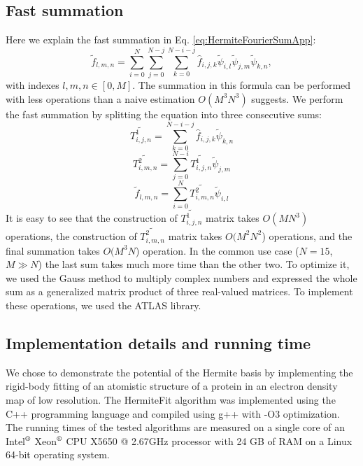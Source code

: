 \subsection{Fast summation}
\label{Sec: Fast summation}
%
Here we explain the fast summation in Eq. \ref{eq:HermiteFourierSumApp}: 
%
\begin{equation}
\tilde{f}_{l,m,n}=\sum_{i=0}^{N}\sum_{j=0}^{N-j}\sum_{k=0}^{N-i-j}\hat{f}_{i,j,k}\tilde{\psi}_{i,l}\tilde{\psi}_{j,m}\tilde{\psi}_{k,n}\label{eq:HermiteFourierSumApp}
,
\end{equation}
with indexes $l,m,n\in[0,M]$. The summation in this formula can
be performed with less operations than a naive estimation $O(M^{3}N^{3})$
suggests. We perform the fast summation by splitting the equation into
three consecutive sums:
%
\begin{equation}
\widetilde{T_{i,j,n}^{1}}=\sum_{k=0}^{N-i-j}\hat{f}_{i,j,k}\tilde{\psi}_{k,n}
\end{equation}
%
\begin{equation}
\widetilde{T_{i,m,n}^{2}}=\sum_{j=0}^{N-i}\widetilde{T_{i,j,n}^{1}}\tilde{\psi}_{j,m}
\end{equation}
%
\begin{equation}
\tilde{f}_{l,m,n}=\sum_{i=0}^{N}\widetilde{T_{i,m,n}^{2}}\tilde{\psi}_{i,l}
\end{equation}
%
It is easy to see that the construction of $\widetilde{T_{i,j,n}^{1}}$
matrix takes $O(MN^{3})$ operations, the construction of $\widetilde{T_{i,m,n}^{2}}$
matrix takes $O(M^{2}N^{2}$) operations, and the final summation
takes $O(M^{3}N$) operation. 
In the common use case ($N=15$, $M \gg N$) the last sum takes much more time than the other two.
To optimize it, we used the Gauss method to multiply complex numbers and expressed the whole sum as
a generalized matrix product of three real-valued matrices.  To implement
these operations, we used the ATLAS library.


\subsection{Implementation details and running time}
We chose to demonstrate the potential of the Hermite basis by implementing the rigid-body fitting of an atomistic structure of a protein in an electron density map of low resolution.
The  HermiteFit algorithm was implemented using the C++ programming language and compiled using g++ with -O3 optimization.
The running times of the tested algorithms are measured on a single core of an Intel$\textsuperscript{\textregistered}$ Xeon$\textsuperscript{\textregistered}$ CPU X5650 @ 2.67GHz 
processor with 24 GB of RAM on a Linux 64-bit operating system.

